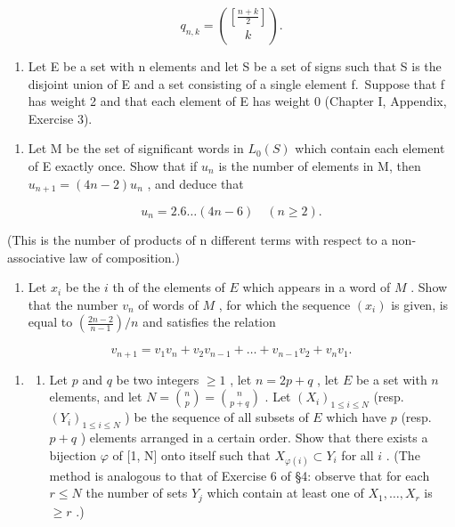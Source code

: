 \[
q _ {n, k} = \binom {\left[ \frac {n + k}{2} \right]} {k}.
\]

\begin{enumerate}
\def\labelenumi{\arabic{enumi}.}
\setcounter{enumi}{10}
\tightlist
\item
  Let E be a set with n elements and let S be a set of signs such that S is the disjoint union of E and a set consisting of a single element f.~Suppose that f has weight 2 and that each element of E has weight 0 (Chapter I, Appendix, Exercise 3).
\end{enumerate}

\begin{enumerate}
\def\labelenumi{(\alph{enumi})}
\tightlist
\item
  Let M be the set of significant words in \(L_{0}(S)\) which contain each element of E exactly once. Show that if \(u_{n}\) is the number of elements in M, then \(u_{n+1} = (4n - 2)u_{n}\) , and deduce that
\end{enumerate}

\[
u _ {n} = 2. 6 \dots (4 n - 6) \quad (n \geqslant 2).
\]

(This is the number of products of n different terms with respect to a non-associative law of composition.)

\begin{enumerate}
\def\labelenumi{(\alph{enumi})}
\setcounter{enumi}{1}
\tightlist
\item
  Let \(x_{i}\) be the \(i\) th of the elements of \(E\) which appears in a word of \(M\) . Show that the number \(v_{n}\) of words of \(M\) , for which the sequence \((x_{i})\) is given, is equal to \((\frac{2n-2}{n-1})/n\) and satisfies the relation
\end{enumerate}

\[
v _ {n + 1} = v _ {1} v _ {n} + v _ {2} v _ {n - 1} + \dots + v _ {n - 1} v _ {2} + v _ {n} v _ {1}.
\]

\begin{enumerate}
\def\labelenumi{\arabic{enumi}.}
\setcounter{enumi}{11}
\tightlist
\item
  \begin{enumerate}
  \def\labelenumii{(\alph{enumii})}
  \tightlist
  \item
    Let \(p\) and \(q\) be two integers \(\geqslant 1\) , let \(n = 2p + q\) , let \(E\) be a set with \(n\) elements, and let \(N = \binom{n}{p} = \binom{n}{p + q}\) . Let \((X_i)_{1 \leqslant i \leqslant N}\) (resp. \((Y_i)_{1 \leqslant i \leqslant N}\) ) be the sequence of all subsets of \(E\) which have \(p\) (resp. \(p + q\) ) elements arranged in a certain order. Show that there exists a bijection \(\varphi\) of {[}1, N{]} onto itself such that \(X_{\varphi(i)} \subset Y_i\) for all \(i\) . (The method is analogous to that of Exercise 6 of §4: observe that for each \(r \leqslant N\) the number of sets \(Y_j\) which contain at least one of \(X_1, \ldots, X_r\) is \(\geqslant r\) .)
  \end{enumerate}
\end{enumerate}

